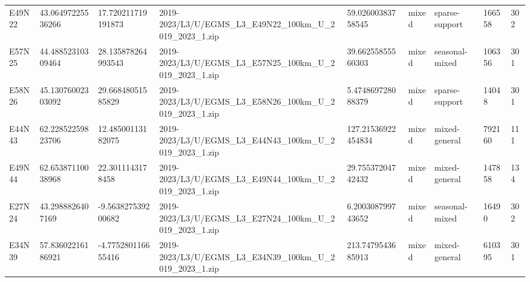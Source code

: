 \begin{landscape}
\begin{longtable}{lllllllll}
E49N22 & 43.06497225536266 & 17.720211719191873 & 2019-2023/L3/U/EGMS\_L3\_E49N22\_100km\_U\_2019\_2023\_1.zip & 59.02600383758545 & mixed & sparse-support & 166558 & 302 \\
E57N25 & 44.48852310309464 & 28.135878264993543 & 2019-2023/L3/U/EGMS\_L3\_E57N25\_100km\_U\_2019\_2023\_1.zip & 39.66255855560303 & mixed & seasonal-mixed & 106356 & 301 \\
E58N26 & 45.13076002303092 & 29.66848051585829 & 2019-2023/L3/U/EGMS\_L3\_E58N26\_100km\_U\_2019\_2023\_1.zip & 5.474869728088379 & mixed & sparse-support & 14048 & 301 \\
E44N43 & 62.22852259823706 & 12.48500113182075 & 2019-2023/L3/U/EGMS\_L3\_E44N43\_100km\_U\_2019\_2023\_1.zip & 127.21536922454834 & mixed & mixed-general & 792160 & 111 \\
E49N44 & 62.65387110038968 & 22.3011143178458 & 2019-2023/L3/U/EGMS\_L3\_E49N44\_100km\_U\_2019\_2023\_1.zip & 29.75537204742432 & mixed & mixed-general & 147858 & 134 \\
E27N24 & 43.2988826407169 & -9.563827539200682 & 2019-2023/L3/U/EGMS\_L3\_E27N24\_100km\_U\_2019\_2023\_1.zip & 6.200308799743652 & mixed & seasonal-mixed & 16490 & 302 \\
E34N39 & 57.83602216186921 & -4.775280116655416 & 2019-2023/L3/U/EGMS\_L3\_E34N39\_100km\_U\_2019\_2023\_1.zip & 213.7479543685913 & mixed & mixed-general & 610395 & 301 \\
\bottomrule
\end{longtable}
\end{landscape}

